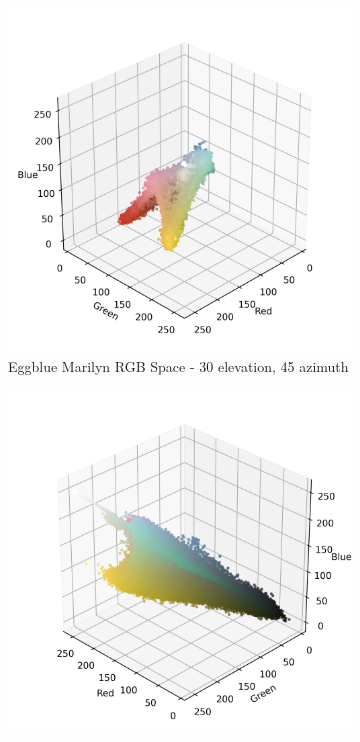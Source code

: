 \documentclass{article}
\begin{document}
\begin{figure}[ht]
  \centering
  \begin{subfigure}{0.45\textwidth}
    \includegraphics[width=\textwidth]{main_files/figure-latex/4_17_eggblue_marilyn_original_scatter.jpg}
    \caption{Eggblue Marilyn RGB Space - 30 \degree elevation, 45 \degree azimuth}
    \label{fig:4_17_eggblue_marilyn_original_scatter}
  \end{subfigure}
  \hfill
  \begin{subfigure}{0.45\textwidth}
    \includegraphics[width=\textwidth]{main_files/figure-latex/4_18_eggblue_marilyn_original_scatter.jpg}

\end{subfigure}
\end{figure}
\end{document}
